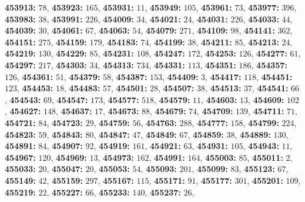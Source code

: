 \textsf{\bfseries 453913:} $78$, \textsf{\bfseries 453923:} $165$, \textsf{\bfseries 453931:} $11$, \textsf{\bfseries 453949:} $105$, \textsf{\bfseries 453961:} $73$, \textsf{\bfseries 453977:} $396$, \textsf{\bfseries 453983:} $38$, \textsf{\bfseries 453991:} $226$, \textsf{\bfseries 454009:} $34$, \textsf{\bfseries 454021:} $24$, \textsf{\bfseries 454031:} $226$, \textsf{\bfseries 454033:} $44$, \textsf{\bfseries 454039:} $30$, \textsf{\bfseries 454061:} $67$, \textsf{\bfseries 454063:} $54$, \textsf{\bfseries 454079:} $271$, \textsf{\bfseries 454109:} $98$, \textsf{\bfseries 454141:} $362$, \textsf{\bfseries 454151:} $275$, \textsf{\bfseries 454159:} $179$, \textsf{\bfseries 454183:} $74$, \textsf{\bfseries 454199:} $38$, \textsf{\bfseries 454211:} $85$, \textsf{\bfseries 454213:} $24$, \textsf{\bfseries 454219:} $130$, \textsf{\bfseries 454229:} $85$, \textsf{\bfseries 454231:} $108$, \textsf{\bfseries 454247:} $172$, \textsf{\bfseries 454253:} $126$, \textsf{\bfseries 454277:} $61$, \textsf{\bfseries 454297:} $217$, \textsf{\bfseries 454303:} $34$, \textsf{\bfseries 454313:} $734$, \textsf{\bfseries 454331:} $113$, \textsf{\bfseries 454351:} $186$, \textsf{\bfseries 454357:} $126$, \textsf{\bfseries 454361:} $51$, \textsf{\bfseries 454379:} $58$, \textsf{\bfseries 454387:} $153$, \textsf{\bfseries 454409:} $3$, \textsf{\bfseries 454417:} $118$, \textsf{\bfseries 454451:} $123$, \textsf{\bfseries 454453:} $18$, \textsf{\bfseries 454483:} $57$, \textsf{\bfseries 454501:} $28$, \textsf{\bfseries 454507:} $38$, \textsf{\bfseries 454513:} $37$, \textsf{\bfseries 454541:} $66$, \textsf{\bfseries 454543:} $69$, \textsf{\bfseries 454547:} $173$, \textsf{\bfseries 454577:} $518$, \textsf{\bfseries 454579:} $11$, \textsf{\bfseries 454603:} $13$, \textsf{\bfseries 454609:} $102$, \textsf{\bfseries 454627:} $148$, \textsf{\bfseries 454637:} $17$, \textsf{\bfseries 454673:} $88$, \textsf{\bfseries 454679:} $74$, \textsf{\bfseries 454709:} $139$, \textsf{\bfseries 454711:} $71$, \textsf{\bfseries 454721:} $84$, \textsf{\bfseries 454723:} $29$, \textsf{\bfseries 454759:} $56$, \textsf{\bfseries 454763:} $288$, \textsf{\bfseries 454777:} $158$, \textsf{\bfseries 454799:} $224$, \textsf{\bfseries 454823:} $59$, \textsf{\bfseries 454843:} $80$, \textsf{\bfseries 454847:} $47$, \textsf{\bfseries 454849:} $67$, \textsf{\bfseries 454859:} $38$, \textsf{\bfseries 454889:} $130$, \textsf{\bfseries 454891:} $84$, \textsf{\bfseries 454907:} $92$, \textsf{\bfseries 454919:} $161$, \textsf{\bfseries 454921:} $63$, \textsf{\bfseries 454931:} $105$, \textsf{\bfseries 454943:} $11$, \textsf{\bfseries 454967:} $120$, \textsf{\bfseries 454969:} $13$, \textsf{\bfseries 454973:} $162$, \textsf{\bfseries 454991:} $164$, \textsf{\bfseries 455003:} $85$, \textsf{\bfseries 455011:} $2$, \textsf{\bfseries 455033:} $20$, \textsf{\bfseries 455047:} $20$, \textsf{\bfseries 455053:} $54$, \textsf{\bfseries 455093:} $201$, \textsf{\bfseries 455099:} $83$, \textsf{\bfseries 455123:} $67$, \textsf{\bfseries 455149:} $42$, \textsf{\bfseries 455159:} $297$, \textsf{\bfseries 455167:} $115$, \textsf{\bfseries 455171:} $91$, \textsf{\bfseries 455177:} $301$, \textsf{\bfseries 455201:} $109$, \textsf{\bfseries 455219:} $22$, \textsf{\bfseries 455227:} $66$, \textsf{\bfseries 455233:} $140$, \textsf{\bfseries 455237:} $26$, 
